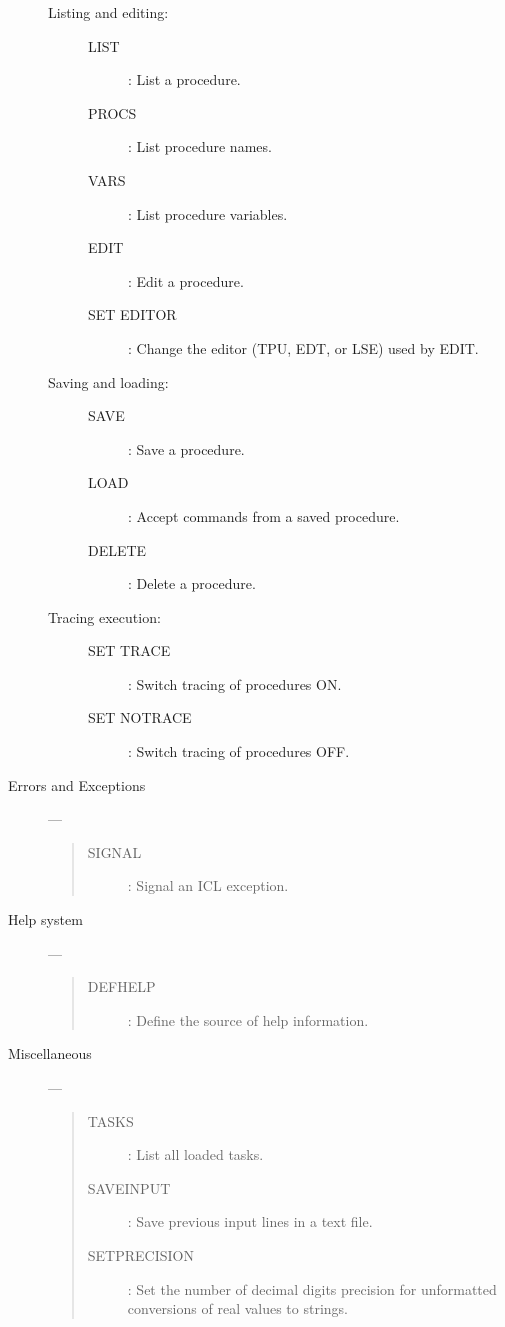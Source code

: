 \begin{description}
\begin{description}
\item [Listing and editing:] \mbox{}
\begin{description}
\item[LIST] :
 List a procedure.
\item[PROCS] :
 List procedure names.
\item[VARS] :
 List procedure variables.
\item[EDIT] :
 Edit a procedure.
\item[SET EDITOR] :
 Change the editor (TPU, EDT, or LSE) used by EDIT.
\end{description}
\item [Saving and loading:] \mbox{}
\begin{description}
\item[SAVE] :
 Save a procedure.
\item[LOAD] :
 Accept commands from a saved procedure.
\item[DELETE] :
 Delete a procedure.
\end{description}
\item [Tracing execution:] \mbox{}
\begin{description}
\item[SET TRACE] :
 Switch tracing of procedures ON.
\item[SET NOTRACE] :
 Switch tracing of procedures OFF.
\end{description}
\end{description}

\item [Errors and Exceptions] ---

\begin{quote}
\begin{description}
\item[SIGNAL] :
 Signal an ICL exception.
\end{description}
\end{quote}

\item [Help system] ---

\begin{quote}
\begin{description}
\item[DEFHELP] :
 Define the source of help information.
\end{description}
\end{quote}

\item [Miscellaneous] ---

\begin{quote}
\begin{description}
\item[TASKS] :
 List all loaded tasks.
\item[SAVEINPUT] :
 Save previous input lines in a text file.
\item[SETPRECISION] :
 Set the number of decimal digits precision for unformatted conversions
 of real values to strings.
\end{description}
\end{quote}
\end{description}

